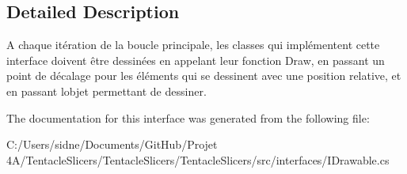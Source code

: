 \subsection{Detailed Description}
A chaque itération de la boucle principale, les classes qui implémentent cette interface doivent être dessinées en appelant leur fonction Draw, en passant un point de décalage pour les éléments qui se dessinent avec une position relative, et en passant l\textquotesingle{}objet permettant de dessiner. 



The documentation for this interface was generated from the following file\+:\begin{DoxyCompactItemize}
\item 
C\+:/\+Users/sidne/\+Documents/\+Git\+Hub/\+Projet 4\+A/\+Tentacle\+Slicers/\+Tentacle\+Slicers/\+Tentacle\+Slicers/src/interfaces/I\+Drawable.\+cs\end{DoxyCompactItemize}
